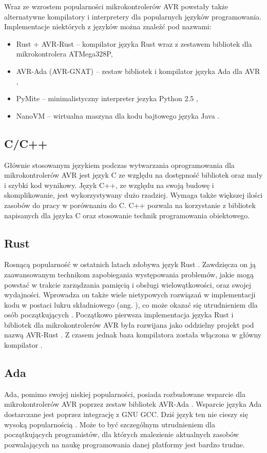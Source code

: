 Wraz ze wzrostem popularności mikrokontrolerów AVR powstały także alternatywne kompilatory i interpretery dla popularnych języków programowania. Implementacje niektórych z języków można znaleźć pod nazwami:
\begin{itemize}
\item Rust + AVR-Rust -- kompilator języka Rust wraz z zestawem bibliotek dla mikrokontrolera ATMega328P\cite{1IntroductionAVRRust},
\item AVR-Ada (AVR-GNAT) -- zestaw bibliotek i kompilator języka Ada dla AVR \cite{AVRAdaWikiHome},
\item PyMite -- minimalistyczny interpreter jezyka Python 2.5 \cite{PyMitePythonWiki},
\item NanoVM -- wirtualna maszyna dla kodu bajtowego języka Java \cite{harbaumHarbaumNanoVM2025}.
\end{itemize}
\subsection{C/C++}
Głównie stosowanym językiem podczas wytwarzania oprogramowania dla mikrokontrolerów AVR jest język C ze względu na dostępność bibliotek oraz mały i szybki kod wynikowy. Język C++, ze względu na swoją budowę i skomplikowanie, jest wykorzystywany dużo rzadziej. Wymaga także większej ilości zasobów do pracy w porównaniu do C. C++ pozwala na korzystanie z bibliotek napisanych dla języka C oraz stosowanie technik programowania obiektowego.
\subsection{Rust}
Rosnącą popularność w ostatnich latach zdobywa język Rust \cite{gasibaThinkThisBeginning2023}. Zawdzięcza on ją zaawansowanym technikom zapobiegania występowania problemów, jakie mogą powstać w trakcie zarządzania pamięcią i obsługi wielowątkowości, oraz swojej wydajności. Wprowadza on także wiele nietypowych rozwiązań w implementacji kodu w postaci lukru składniowego (ang. ), co może okazać się utrudnieniem dla osób początkujących . Początkowo pierwsza implementacja języka Rust i bibliotek dla mikrokontrolerów AVR była rozwijana jako oddzielny projekt pod nazwą AVR-Rust \cite{AvrrustRustlegacyforkDeprecated}. Z czasem jednak baza kompilatora została włączona w główny kompilator \cite{RFCMergingAvrrust}.
\subsection{Ada}
Ada, pomimo swojej niskiej popularności, posiada rozbudowane wsparcie dla mikrokontrolerów AVR poprzez zestaw bibliotek AVR-Ada \cite{AVRAdaWikiHome}. Wsparcie języka Ada dostarczane jest poprzez integrację z GNU GCC. Dziś język ten nie cieszy się wysoką popularnością \cite{SOBRAL201930Y}. Może to być szczególnym utrudnieniem dla początkujących programistów, dla których znalezienie aktualnych zasobów pozwalających na naukę programowania danej platformy jest bardzo trudne.

